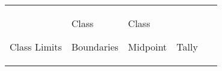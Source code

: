 \documentclass[]{book}
\begin{document}
\begin{longtable}[]{@{}lllll@{}}
\toprule
\endhead
\begin{minipage}[t]{0.18\columnwidth}\raggedright
~

Class Limits\strut
\end{minipage} & \begin{minipage}[t]{0.23\columnwidth}\raggedright
Class

Boundaries\strut
\end{minipage} & \begin{minipage}[t]{0.13\columnwidth}\raggedright
Class

Midpoint\strut
\end{minipage} & \begin{minipage}[t]{0.10\columnwidth}\raggedright
~

Tally\strut
\end{minipage} & \begin{minipage}[t]{0.14\columnwidth}\raggedright
~


\end{minipage}
\end{longtable}
\end{document}
